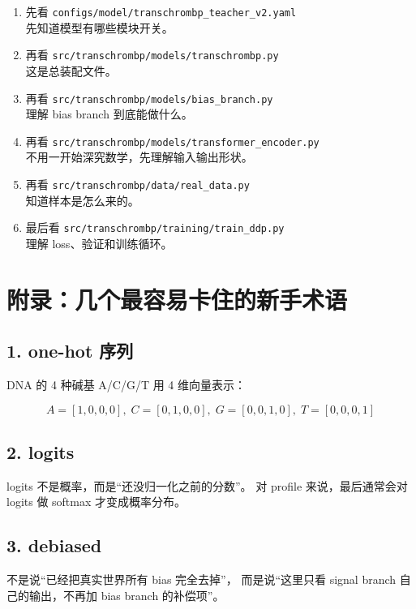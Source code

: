 \documentclass[11pt,a4paper]{ctexart}
\begin{document}
\begin{enumerate}[leftmargin=2em]
\item 先看 \texttt{configs/model/transchrombp\_teacher\_v2.yaml} \\
  先知道模型有哪些模块开关。
\item 再看 \texttt{src/transchrombp/models/transchrombp.py} \\
  这是总装配文件。
\item 再看 \texttt{src/transchrombp/models/bias\_branch.py} \\
  理解 bias branch 到底能做什么。
\item 再看 \texttt{src/transchrombp/models/transformer\_encoder.py} \\
  不用一开始深究数学，先理解输入输出形状。
\item 再看 \texttt{src/transchrombp/data/real\_data.py} \\
  知道样本是怎么来的。
\item 最后看 \texttt{src/transchrombp/training/train\_ddp.py} \\
  理解 loss、验证和训练循环。
\end{enumerate}

\section{附录：几个最容易卡住的新手术语}

\subsection*{1. one-hot 序列}

DNA 的 4 种碱基 A/C/G/T 用 4 维向量表示：

\[
A=[1,0,0,0],\;
C=[0,1,0,0],\;
G=[0,0,1,0],\;
T=[0,0,0,1]
\]

\subsection*{2. logits}

logits 不是概率，而是“还没归一化之前的分数”。
对 profile 来说，最后通常会对 logits 做 softmax 才变成概率分布。

\subsection*{3. debiased}

不是说“已经把真实世界所有 bias 完全去掉”，
而是说“这里只看 signal branch 自己的输出，不再加 bias branch 的补偿项”。
\end{document}
